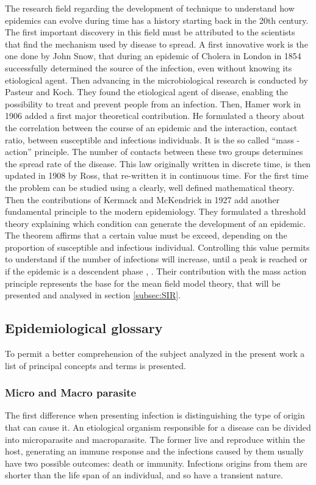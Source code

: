 The research field regarding the development of technique to understand how epidemics can evolve during time has a history starting back in the 20th century. The first important discovery in this field must be attributed to the scientists that find the mechanism used by disease to spread. 
A first innovative work is the one done by John Snow, that during an epidemic of Cholera in London in 1854 successfully determined the source of the infection, even without knowing its etiological agent. Then advancing in the microbiological research is conducted by Pasteur and Koch. They found the etiological agent of disease, enabling the possibility to treat and prevent people from an infection. 
Then, Hamer work in 1906 added a first major theoretical contribution. He formulated a theory about the correlation between the course of an epidemic and the interaction, contact ratio, between susceptible and infectious individuals. It is the so called “mass -action” principle. The number of contacts between these two groups determines the spread rate of the disease. 
This law originally written in discrete time, is then updated in 1908 by Ross, that re-written it  in continuous time. For the first time the problem can be studied using a clearly, well defined mathematical theory. Then the contributions of Kermack and McKendrick in 1927 add another fundamental principle to the modern epidemiology. They formulated a threshold theory explaining which condition can generate the development of an epidemic. The theorem affirms that a certain value must be exceed, depending on the proportion of susceptible and infectious individual. Controlling this value permits to understand if the number of infections will increase, until a peak is reached or if the epidemic is a descendent phase \cite{Mata2021}, \cite{Anderson_82}. 
Their contribution with the mass action principle represents the base for the mean field model theory, that will be presented and analysed in section \ref{subsec:SIR}. 



\subsection{Epidemiological glossary}
To permit a better comprehension of the subject analyzed in the present work a list of principal concepts and terms is presented.

\subsubsection{Micro and Macro parasite}
	The first difference when presenting infection is distinguishing the type of origin that can cause it. An etiological organism responsible for a disease can be divided into microparasite and macroparasite. The former live and reproduce within the host, generating an immune response and the infections caused by them usually have two possible outcomes: death or immunity. Infections origins from them are shorter than the life span of an individual, and so have a transient nature.
